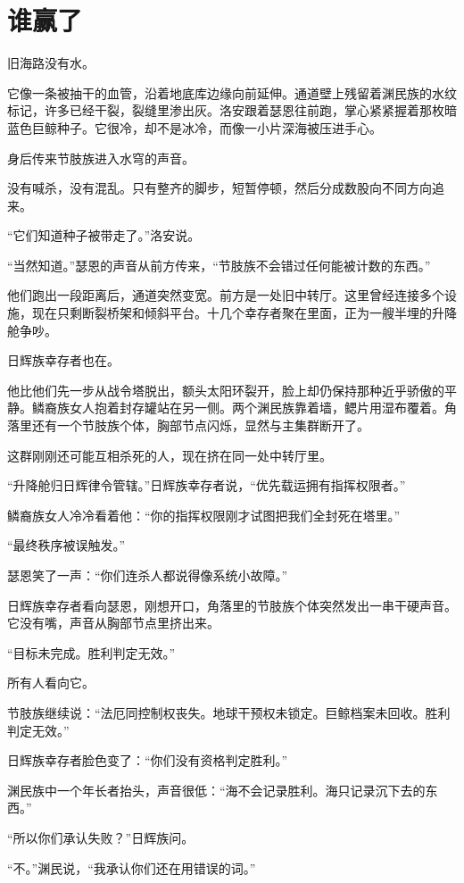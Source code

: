 \chapter{谁赢了}

旧海路没有水。

它像一条被抽干的血管，沿着地底库边缘向前延伸。通道壁上残留着渊民族的水纹标记，许多已经干裂，裂缝里渗出灰。洛安跟着瑟恩往前跑，掌心紧紧握着那枚暗蓝色巨鲸种子。它很冷，却不是冰冷，而像一小片深海被压进手心。

身后传来节肢族进入水穹的声音。

没有喊杀，没有混乱。只有整齐的脚步，短暂停顿，然后分成数股向不同方向追来。

“它们知道种子被带走了。”洛安说。

“当然知道。”瑟恩的声音从前方传来，“节肢族不会错过任何能被计数的东西。”

他们跑出一段距离后，通道突然变宽。前方是一处旧中转厅。这里曾经连接多个设施，现在只剩断裂桥架和倾斜平台。十几个幸存者聚在里面，正为一艘半埋的升降舱争吵。

日辉族幸存者也在。

他比他们先一步从战令塔脱出，额头太阳环裂开，脸上却仍保持那种近乎骄傲的平静。鳞裔族女人抱着封存罐站在另一侧。两个渊民族靠着墙，鳃片用湿布覆着。角落里还有一个节肢族个体，胸部节点闪烁，显然与主集群断开了。

这群刚刚还可能互相杀死的人，现在挤在同一处中转厅里。

“升降舱归日辉律令管辖。”日辉族幸存者说，“优先载运拥有指挥权限者。”

鳞裔族女人冷冷看着他：“你的指挥权限刚才试图把我们全封死在塔里。”

“最终秩序被误触发。”

瑟恩笑了一声：“你们连杀人都说得像系统小故障。”

日辉族幸存者看向瑟恩，刚想开口，角落里的节肢族个体突然发出一串干硬声音。它没有嘴，声音从胸部节点里挤出来。

“目标未完成。胜利判定无效。”

所有人看向它。

节肢族继续说：“法厄同控制权丧失。地球干预权未锁定。巨鲸档案未回收。胜利判定无效。”

日辉族幸存者脸色变了：“你们没有资格判定胜利。”

渊民族中一个年长者抬头，声音很低：“海不会记录胜利。海只记录沉下去的东西。”

“所以你们承认失败？”日辉族问。

“不。”渊民说，“我承认你们还在用错误的词。”

